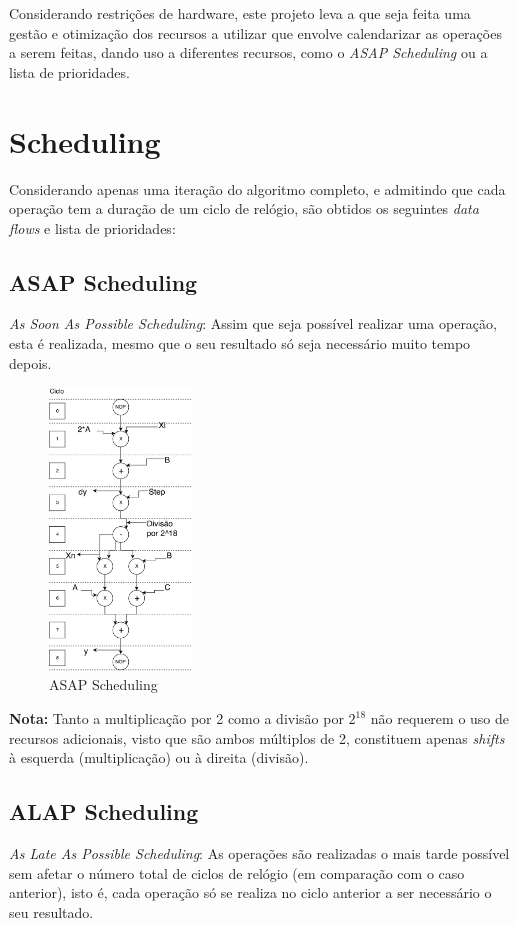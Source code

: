\documentclass{article} %
\begin{document}
		\noindent Considerando restrições de hardware, este projeto leva a que seja feita uma gestão e otimização dos recursos a utilizar que envolve calendarizar as operações a serem feitas, dando uso a diferentes recursos, como o \emph{ASAP Scheduling} ou a lista de prioridades.

	\section{Scheduling}
		Considerando apenas uma iteração do algoritmo completo, e admitindo que cada operação tem a duração de um ciclo de relógio, são obtidos os seguintes \emph{data flows} e lista de prioridades:

		\subsection{ASAP Scheduling}
			\emph{As Soon As Possible Scheduling}: Assim que seja possível realizar uma operação, esta é realizada, mesmo que o seu resultado só seja necessário muito tempo depois.


			\begin{figure}[ht]
				\begin{center}
					\includegraphics[width=1.5in]{ASAP.pdf}
					\caption{ASAP Scheduling}
					\label{fig:ASAP}
				\end{center}
			\end{figure}
			
			\textbf{Nota:} Tanto a multiplicação por 2 como a divisão por $2^{18}$ não requerem o uso de recursos adicionais, visto que são ambos múltiplos de 2, constituem apenas \emph{shifts} à esquerda (multiplicação) ou à direita (divisão). 

		\clearpage

		\subsection{ALAP Scheduling}
			\emph{As Late As Possible Scheduling}: As operações são realizadas o mais tarde possível sem afetar o número total de ciclos de relógio (em comparação com o caso anterior), isto é, cada operação só se realiza no ciclo anterior a ser necessário o seu resultado.\\
\end{document}
